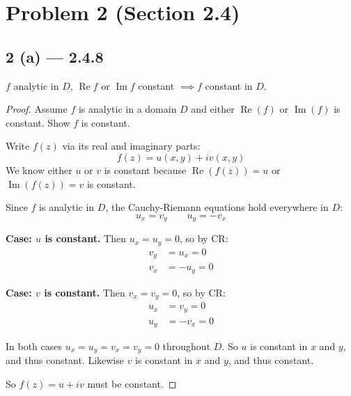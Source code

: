 \documentclass{article}
\begin{document}
\section*{Problem 2 (Section 2.4)}

\subsection*{2 (a) --- 2.4.8}
$f$ analytic in $D$, $\operatorname{Re} f$ or $\operatorname{Im} f$ constant
$\implies f$ constant in $D$.
\begin{proof}
  Assume $f$ is analytic in a domain $D$ and either $\operatorname{Re}(f)$ or
  $\operatorname{Im}(f)$ is constant. Show $f$ is constant.

  Write $f(z)$ via its real and imaginary parts:
  \[
    f(z) = u(x, y) + iv(x, y)
  \]
  We know either $u$ or $v$ is constant because $\operatorname{Re}(f(z)) = u$
  or $\operatorname{Im}(f(z)) = v$ is constant.

  Since $f$ is analytic in $D$, the Cauchy-Riemann equations hold everywhere in
  $D$:
  \[
    u_x = v_y \qquad u_y = -v_x
  \]

  \textbf{Case: $u$ is constant.} Then $u_x = u_y = 0$, so by CR:
  \begin{align*}
    v_y &= u_x = 0
    \\ v_x &= -u_y = 0
  \end{align*}

  \textbf{Case: $v$ is constant.} Then $v_x = v_y = 0$, so by CR:
  \begin{align*}
    u_x &= v_y = 0
    \\ u_y &= -v_x = 0
  \end{align*}

  In both cases $u_x = u_y = v_x = v_y = 0$ throughout $D$. So $u$ is constant
  in $x$ and $y$, and thus constant. Likewise $v$ is constant in $x$ and $y$,
  and thus constant.

  So $f(z) = u + iv$ must be constant.
\end{proof}
\end{document}
